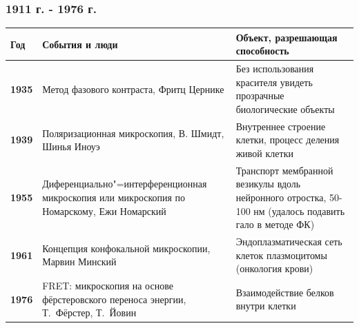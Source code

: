 \documentclass[9pt, compress, xcolor=table]{beamer}
\begin{document}
\begin{frame}[fragile]
  \frametitle{1911 г. - 1976 г.}
  
\begin{table}[htbp]
\begin{center}
\small
\arrayrulewidth=1pt
\begin{tabular}{|l|p{}|p{}|}
\hline
\cellcolor{gray!25}\textbf{Год} & 
\cellcolor{gray!25}\textbf{События и люди} & 
\cellcolor{gray!25}\textbf{Объект, разрешающая способность} \\ \hline
\textbf{1935} & 
Метод фазового контраста, Фритц Цернике & 
Без использования красителя увидеть прозрачные биологические объекты \\ \hline
\textbf{1939} & 
Поляризационная микроскопия, В. Шмидт, Шинья Иноуэ & 
Внутреннее строение клетки, процесс деления живой клетки \\ \hline
\textbf{1955} & 
Диференциально"=интерференционная микроскопия или микроскопия по Номарскому, Ежи Номарский & 
Транспорт мембранной везикулы вдоль нейронного отростка, 50-100 нм (удалось подавить гало в методе ФК) \\ \hline
\textbf{1961} & 
Концепция конфокальной микроскопии, Марвин Минский& 
Эндоплазматическая сеть клеток плазмоцитомы (онкология крови) \\ \hline
\textbf{1976} & 
FRET: микроскопия на основе фёрстеровского переноса энергии, Т.~Фёрстер, Т.~Йовин & 
Взаимодействие белков внутри клетки \\ \hline
\end{tabular}\label{tab2}
\end{center}
\end{table}

\end{frame}
\end{document}
